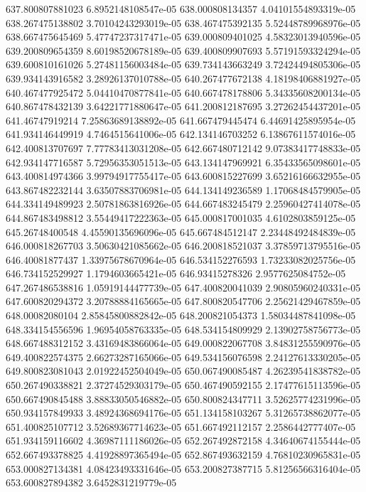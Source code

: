 {637.800807881023 6.8952148108547e-05
638.000808134357 4.04101554893319e-05
638.267475138802 3.70104243293019e-05
638.467475392135 5.52448789968976e-05
638.667475645469 5.47747237317471e-05
639.000809401025 4.58323013940596e-05
639.200809654359 8.60198520678189e-05
639.400809907693 5.57191593324294e-05
639.600810161026 5.27481156003484e-05
639.734143663249 3.72424494805306e-05
639.934143916582 3.28926137010788e-05
640.267477672138 4.18198406881927e-05
640.467477925472 5.04410470877841e-05
640.667478178806 5.34335608200134e-05
640.867478432139 3.64221771880647e-05
641.200812187695 3.27262454437201e-05
641.46747919214 7.25863689138892e-05
641.667479445474 6.44691425895954e-05
641.934146449919 4.7464515641006e-05
642.134146703252 6.13867611574016e-05
642.400813707697 7.77783413031208e-05
642.667480712142 9.07383417748833e-05
642.934147716587 5.72956353051513e-05
643.134147969921 6.35433565098601e-05
643.400814974366 3.99794917755417e-05
643.600815227699 3.65216166632955e-05
643.867482232144 3.63507883706981e-05
644.134149236589 1.17068484579905e-05
644.334149489923 2.50781863816926e-05
644.667483245479 2.25960427414078e-05
644.867483498812 3.55449417222363e-05
645.000817001035 4.6102803859125e-05
645.26748400548 4.45590135696096e-05
645.667484512147 2.23448492484839e-05
646.000818267703 3.50630421085662e-05
646.200818521037 3.37859713795516e-05
646.40081877437 1.33975678670964e-05
646.534152276593 1.73233082025756e-05
646.734152529927 1.1794603665421e-05
646.93415278326 2.9577625084752e-05
647.267486538816 1.05919144477739e-05
647.400820041039 2.90805960240331e-05
647.600820294372 3.20788884165665e-05
647.800820547706 2.25621429467859e-05
648.00082080104 2.85845800882842e-05
648.200821054373 1.58034487841098e-05
648.334154556596 1.96954058763335e-05
648.534154809929 2.13902758756773e-05
648.667488312152 3.43169483866064e-05
649.000822067708 3.84831255590976e-05
649.400822574375 2.66273287165066e-05
649.534156076598 2.24127613330205e-05
649.800823081043 2.01922452504049e-05
650.067490085487 4.26239541838782e-05
650.267490338821 2.37274529303179e-05
650.467490592155 2.17477615113596e-05
650.667490845488 3.88833050546882e-05
650.800824347711 3.52625774231996e-05
650.934157849933 3.48924368694176e-05
651.134158103267 5.31265738862077e-05
651.400825107712 3.52689367714623e-05
651.667492112157 2.2586442777407e-05
651.934159116602 4.36987111186026e-05
652.267492872158 4.34640674155444e-05
652.667493378825 4.41928897365494e-05
652.867493632159 4.76810230965831e-05
653.000827134381 4.08423493331646e-05
653.200827387715 5.81256566316404e-05
653.600827894382 3.6452831219779e-05
}
